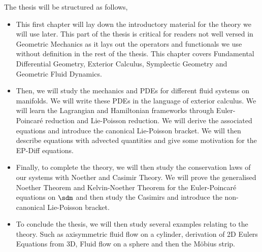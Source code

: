 \noindent
The thesis will be structured as follows,
\begin{itemize}
  \item This first chapter will lay down the introductory material for the theory we will use later. This part of the thesis is critical for readers not well versed in Geometric Mechanics as it lays out the operators and functionals we use without definition in the rest of the thesis. This chapter covers Fundamental Differential Geometry, Exterior Calculus, Symplectic Geometry and Geometric Fluid Dynamics.
  \item Then, we will study the mechanics and PDEs for different fluid systems on manifolds. We will write these PDEs in the language of exterior calculus. We will learn the Lagrangian and Hamiltonian frameworks through Euler-Poincar\'e reduction and Lie-Poisson reduction. We will derive the associated equations and introduce the canonical Lie-Poisson bracket. We will then describe equations with advected quantities and give some motivation for the EP-Diff equations.
  \item Finally, to complete the theory, we will then study the conservation laws of our systems with Noether and Casimir Theory. We will prove the generalised Noether Theorem and Kelvin-Noether Theorem for the Euler-Poincar\'e equations on $\sdm$ and then study the Casimirs and introduce the non-canonical Lie-Poisson bracket.
  \item To conclude the thesis, we will then study several examples relating to the theory. Such as axisymmetric fluid flow on a cylinder, derivation of 2D Eulers Equations from 3D, Fluid flow on a sphere and then the M\"obius strip.
\end{itemize}

